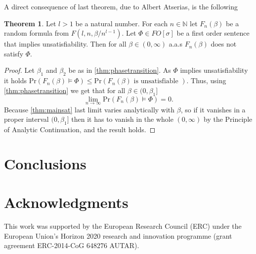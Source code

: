\documentclass[12pt,notitlepage,a4paper]{article}
\theoremstyle{definition}
\newtheorem{theorem}{Theorem}[section]
\newcommand{\N}{\mathbb{N}}
\newcommand{\Ln}{\lim\limits_{n\to \infty}}
\newcommand{\PR}[1]{\mathrm{Pr}\left(#1\right)}
\begin{document}
A direct consequence of last theorem, due to Albert Atserias, is the following

\begin{theorem} \label{thm:satapplication}
	Let $l>1$ be a natural number.
	For each $n\in \N$ let $F_n(\beta)$ be a random formula from
	$F(l,n,\beta/n^{l-1})$. Let $\Phi\in FO[\sigma]$ be a first order
	sentence that implies unsatisfiability.  Then for all $\beta\in (0,\infty)$
	a.a.s $F_n(\beta)$ does not satisfy $\Phi$.
\end{theorem}
\begin{proof}
	Let $\beta_1$ and $\beta_2$ be as in \cref{thm:phasetransition}. 
	As $\Phi$ implies unsatisfiability it holds
	$\PR{F_n(\beta)\models \Phi  }\leq  
	\PR{F_n(\beta) \text{ is unsatisfiable }  }$. Thus, using \cref{thm:phasetransition}
	we get that for all $\beta\in (0,\beta_1]$
	\[
	\Ln \PR{F_n(\beta)\models \Phi  }=0.
	\]
	Because \cref{thm:mainsat} last limit varies analytically with $\beta$, so
	if it vanishes in a proper interval $(0,\beta_1]$ then it has to vanish
	in the whole $(0,\infty)$ by the Principle of Analytic Continuation, and the result 
	holds. 
\end{proof}


\section*{Conclusions}


\section*{Acknowledgments}
This work was supported by the European Research Council (ERC) under the European Union's 
Horizon 2020 research and innovation programme (grant agreement ERC-2014-CoG 648276 AUTAR).\par
{}



	
\end{document}
